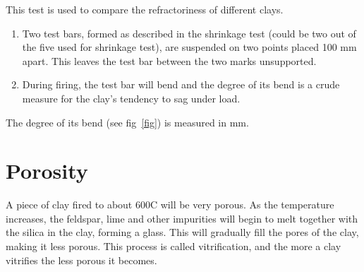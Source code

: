 This test is used to compare the refractoriness of different clays.
\begin{enumerate}
\item Two test bars, formed as described in the shrinkage test (could be two 
out of the five used for shrinkage test), are suspended on two points placed 
100 mm apart. This leaves the test bar between the two marks unsupported.
  
\item During firing, the test bar will bend and the degree of its bend is a 
crude measure for the clay's tendency to sag under load.
\end{enumerate}
The degree of its bend (see fig~\ref{fig}) is measured in mm.
\section{Porosity}
A piece of clay fired to about 600\degree C will be very porous. As the 
temperature increases, the feldspar, lime and other impurities will begin to 
melt together with the silica in the clay, forming a glass. This will gradually 
fill the pores of the clay, making it less porous. This process is called 
vitrification, and the more a clay vitrifies the less porous it becomes.

